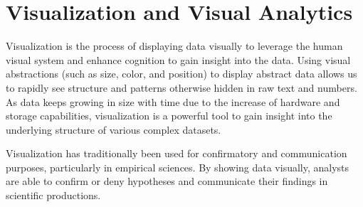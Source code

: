

\section{Visualization and Visual Analytics}

Visualization is the process of displaying data visually to leverage the human visual system and enhance cognition to gain insight into the data\cite{cardReadingsInformationVisualization1999}.
Using visual abstractions (such as size, color, and position) to display abstract data allows us to rapidly see structure and patterns otherwise hidden in raw text and numbers.
As data keeps growing in size with time due to the increase of hardware and storage capabilities, visualization is a powerful tool to gain insight into the underlying structure of various complex datasets.

Visualization has traditionally been used for confirmatory and communication purposes, particularly in empirical sciences\cite{shneidermanInventingDiscoveryTools2002}.
By showing data visually, analysts are able to confirm or deny hypotheses and communicate their findings in scientific productions.


